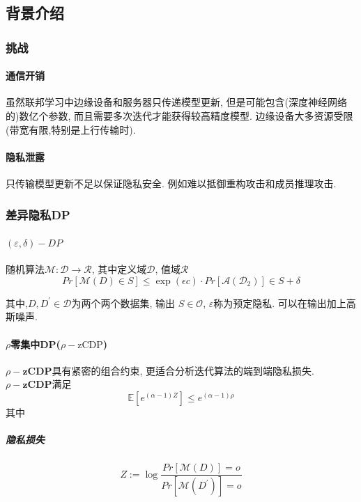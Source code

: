 \documentclass[a4paper]{article}
\theoremstyle{definition}
\numberwithin{equation}{section}
\begin{document}
\subsection{背景介绍}

\subsubsection{挑战}

\paragraph{通信开销}
虽然联邦学习中边缘设备和服务器只传递模型更新, 但是可能包含(深度神经网络的)数亿个参数, 而且需要多次迭代才能获得较高精度模型. 边缘设备大多资源受限(带宽有限,特别是上行传输时).
\paragraph{隐私泄露}
只传输模型更新不足以保证隐私安全. 例如难以抵御重构攻击和成员推理攻击.


\subsubsection{差异隐私DP}
\paragraph{$(\varepsilon,\delta)-DP$} 
随机算法$\mathcal{M:D \to R}$, 其中定义域$\mathcal{D}$, 值域$\mathcal{R}$
\begin{equation}
    Pr [ \mathcal{M}(D) \in S ] \leqslant \exp(\epsilon c) \cdot Pr [ \mathcal{A(D_2)} ] \in S  + \delta 
\end{equation}

其中,$D, D^{'} \in \mathcal{D}$为两个两个数据集, 输出 $S \in \mathcal{O}$, $\varepsilon$称为预定隐私.
可以在输出加上高斯噪声.

\paragraph{$\rho$零集中DP($\rho-\text{zCDP}$)}
$\rho-\textbf{zCDP}$具有紧密的组合约束, 更适合分析迭代算法的端到端隐私损失. 
$\rho-\textbf{zCDP}$满足
\begin{equation}
    \mathbb{E}[e^{(\alpha-1)Z}] \leqslant e^{(\alpha -1)\rho}
\end{equation} 
其中\subparagraph{隐私损失} 
\begin{equation}
    Z := \log \frac{Pr[\mathcal{M}(D)]=o}{Pr[\mathcal{M}(D^{'})]=o} 
\end{equation}
\end{document}
